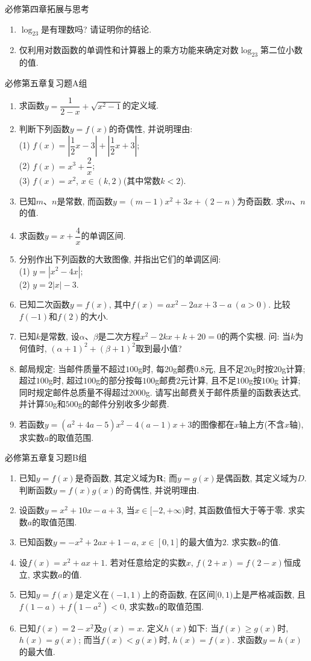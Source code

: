 \documentclass[10pt,a4paper]{article}
\begin{document}
必修第四章拓展与思考
\begin{enumerate}[1.]
\item $\log_23$是有理数吗? 请证明你的结论.
\item 仅利用对数函数的单调性和计算器上的乘方功能来确定对数$\log_23$第二位小数的值.
\end{enumerate}

必修第五章复习题A组
\begin{enumerate}[1.]
\item 求函数$y=\dfrac1{2-x}+\sqrt{x^2-1}$的定义域.
\item 判断下列函数$y=f(x)$的奇偶性, 并说明理由:\\
(1) $f(x)=|\dfrac 12 x-3|+|\dfrac 12 x+3|$;\\
(2) $f(x)=x^3+\dfrac 2x$;\\
(3) $f(x)=x^2$, $x\in (k, 2)$(其中常数$k<2$).
\item 已知$m$、$n$是常数, 而函数$y=(m-1)x^2+3x+(2-n)$为奇函数. 求$m$、$n$的值.
\item 求函数$y=x+\dfrac 4x$的单调区间.
\item 分别作出下列函数的大致图像, 并指出它们的单调区间:\\
(1) $y=|x^2-4x|$;\\
(2) $y=2|x|-3$.
\item 已知二次函数$y=f(x)$, 其中$f(x)=ax^2-2ax+3-a \ (a>0)$. 比较$f(-1)$和$f(2)$的大小.
\item 已知$k$是常数, 设$\alpha$、$\beta$是二次方程$x^2-2kx+k+20=0$的两个实根. 问: 当$k$为
何值时, $(\alpha+1)^2+(\beta+1)^2$取到最小值?
\item 邮局规定: 当邮件质量不超过$100$g时, 每$20$g邮费$0.8$元, 且不足$20$g时按$20$g计算; 超过$100$g时, 超过$100$g的部分按每$100$g邮费$2$元计算, 且不足$100$g按$100$g
计算; 同时规定邮件总质量不得超过$2000$g. 请写出邮费关于邮件质量的函数表达式, 并计算$50$g和$500$g的邮件分别收多少邮费.
\item 若函数$y=(a^2+4a-5)x^2-4(a-1)x+3$的图像都在$x$轴上方(不含$x$轴), 求实数$a$的取值范围.
\end{enumerate}

必修第五章复习题B组
\begin{enumerate}[1.]
\item 已知$y=f(x)$是奇函数, 其定义域为$\mathbf{R}$; 而$y=g(x)$是偶函数, 其定义域为$D$. 判断函数$y=f(x)g(x)$的奇偶性, 并说明理由.
\item 设函数$y=x^2+10x-a+3$, 当$x\in [-2, +\infty)$时, 其函数值恒大于等于零. 求实数$a$的取值范围.
\item 已知函数$y=-x^2+2ax+1-a$, $x\in [0, 1]$的最大值为$2$. 求实数$a$的值.
\item 设$f(x)=x^2+ax+1$. 若对任意给定的实数$x$, $f(2+x)=f(2-x)$恒成立, 求实数$a$的值.
\item 已知$y=f(x)$是定义在$(-1, 1)$上的奇函数, 在区间$[0, 1)$上是严格减函数, 且$f(1-a)+f(1-a^2)<0$, 求实数$a$的取值范围.
\item 已知$f(x)=2-x^2$及$g(x)=x$. 定义$h(x)$如下: 当$f(x)\ge g(x)$时, $h(x)=g(x)$; 而当$f(x)<g(x)$时, $h(x)=f(x)$. 求函数$y=h(x)$的最大值.
\end{enumerate}
\end{document}
